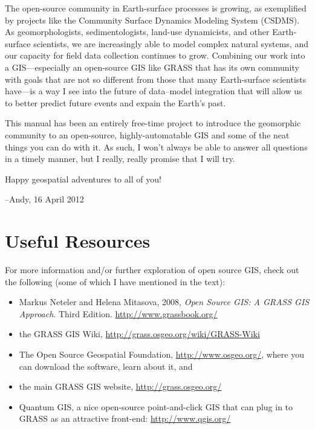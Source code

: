 \documentclass{book}
\begin{document}
The open-source community in Earth-surface processes is growing, as exemplified by projects like the Community Surface Dynamics Modeling System (CSDMS). As geomorphologists, sedimentologists, land-use dynamicists, and other Earth-surface scientists, we are increasingly able to model complex natural systems, and our capacity for field data collection continues to grow. Combining our work into a GIS---especially an open-source GIS like GRASS that has its own community with goals that are not so different from those that many Earth-surface scientists have---is a way I see into the future of data--model integration that will allow us to better predict future events and expain the Earth's past.

This manual has been an entirely free-time project to introduce the geomorphic community to an open-source, highly-automatable GIS and some of the neat things you can do with it. As such, I won't always be able to answer all questions in a timely manner, but I really, really promise that I will try.

Happy geospatial adventures to all of you!

\vspace{.7cm}
\hspace{2cm}--Andy, 16 April 2012
\vspace{.7cm}
\pagebreak

\section{Useful Resources}

For more information and/or further exploration of open source GIS, check out the following (some of which I have mentioned in the text):
\begin{itemize}
 \item Markus Neteler and Helena Mitasova, 2008, \emph{Open Source GIS: A GRASS GIS Approach}. Third Edition. \url{http://www.grassbook.org/}
 \item the GRASS GIS Wiki, \url{http://grass.osgeo.org/wiki/GRASS-Wiki}
 \item The Open Source Geospatial Foundation, \url{http://www.osgeo.org/}, where you can download the software, learn about it, and 
 \item the main GRASS GIS website, \url{http://grass.osgeo.org/}
 \item Quantum GIS, a nice open-source point-and-click GIS that can plug in to GRASS as an attractive front-end: \url{http://www.qgis.org/}
\end{itemize}
\end{document}
